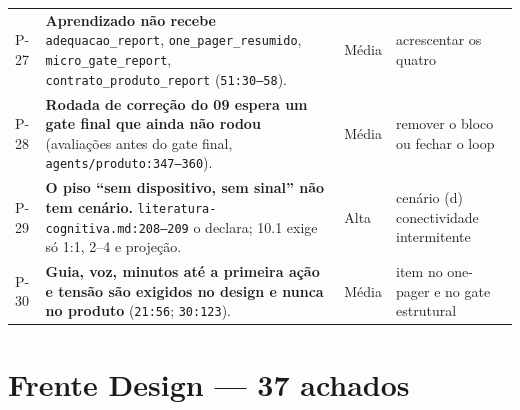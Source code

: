 \documentclass[11pt,a4paper]{article}
\begin{document}
\begin{longtable}{@{}p{0.9cm} >{\raggedright\arraybackslash}p{8.6cm} p{1.1cm} >{\raggedright\arraybackslash}p{4.9cm}@{}}
P-27 & \textbf{Aprendizado não recebe} \texttt{adequacao\_report}, \texttt{one\_pager\_resumido}, \texttt{micro\_gate\_report}, \texttt{contrato\_produto\_report} (\texttt{51:30--58}). & Média & acrescentar os quatro \\
P-28 & \textbf{Rodada de correção do 09 espera um gate final que ainda não rodou} (avaliações antes do gate final, \texttt{agents/produto:347--360}). & Média & remover o bloco ou fechar o loop \\
P-29 & \textbf{O piso ``sem dispositivo, sem sinal'' não tem cenário.} \texttt{literatura-cognitiva.md:208--209} o declara; 10.1 exige só 1:1, 2--4 e projeção. & Alta & cenário (d) conectividade intermitente \\
P-30 & \textbf{Guia, voz, minutos até a primeira ação e tensão são exigidos no design e nunca no produto} (\texttt{21:56}; \texttt{30:123}). & Média & item no one-pager e no gate estrutural \\
\end{longtable}
\normalsize

\section{Frente Design --- 37 achados}
\end{document}
